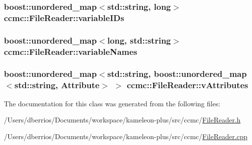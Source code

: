 \hypertarget{classccmc_1_1_file_reader_af87bd665411c9c8ce943040ff5b13055}{
\subsubsection[{variable\-I\-Ds}]{\setlength{\rightskip}{0pt plus 5cm}boost\-::unordered\-\_\-map$<$std\-::string, long$>$ ccmc\-::\-File\-Reader\-::variable\-I\-Ds\hspace{0.3cm}{\ttfamily [protected]}}}\label{classccmc_1_1_file_reader_af87bd665411c9c8ce943040ff5b13055}
\hypertarget{classccmc_1_1_file_reader_a94d580d26fd966be477efb3fd9877ea9}{
\subsubsection[{variable\-Names}]{\setlength{\rightskip}{0pt plus 5cm}boost\-::unordered\-\_\-map$<$long, std\-::string$>$ ccmc\-::\-File\-Reader\-::variable\-Names\hspace{0.3cm}{\ttfamily [protected]}}}\label{classccmc_1_1_file_reader_a94d580d26fd966be477efb3fd9877ea9}
\hypertarget{classccmc_1_1_file_reader_a1eb038b0d8cb945df2b02c4cb63d0aa3}{
\subsubsection[{v\-Attributes}]{\setlength{\rightskip}{0pt plus 5cm}boost\-::unordered\-\_\-map$<$std\-::string, boost\-::unordered\-\_\-map$<$std\-::string, {\bf Attribute}$>$ $>$ ccmc\-::\-File\-Reader\-::v\-Attributes\hspace{0.3cm}{\ttfamily [protected]}}}\label{classccmc_1_1_file_reader_a1eb038b0d8cb945df2b02c4cb63d0aa3}


The documentation for this class was generated from the following files\-:\begin{DoxyCompactItemize}
\item 
/\-Users/dberrios/\-Documents/workspace/kameleon-\/plus/src/ccmc/\hyperlink{_file_reader_8h}{File\-Reader.\-h}\item 
/\-Users/dberrios/\-Documents/workspace/kameleon-\/plus/src/ccmc/\hyperlink{_file_reader_8cpp}{File\-Reader.\-cpp}\end{DoxyCompactItemize}
